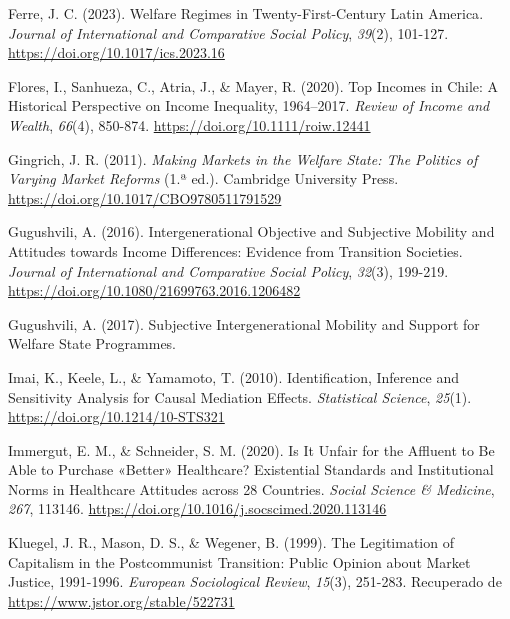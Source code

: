 \documentclass[
  spanish,
  letterpaper,
  DIV=11,
  numbers=noendperiod,
  oneside]{scrartcl}
\newlength{\cslhangindent}
\newenvironment{CSLReferences}[2] %
 {\begin{list}{}{%
  \setlength{\itemindent}{0pt}
  \setlength{\leftmargin}{0pt}
  \setlength{\parsep}{0pt}
  \ifodd #1
   \setlength{\leftmargin}{\cslhangindent}
   \setlength{\itemindent}{-1\cslhangindent}
  \fi
  \setlength{\itemsep}{#2\baselineskip}}}
 {\end{list}}
\begin{document}
\begin{CSLReferences}{1}{0}
Ferre, J. C. (2023). Welfare Regimes in Twenty-First-Century {Latin
America}. \emph{Journal of International and Comparative Social Policy},
\emph{39}(2), 101-127. \url{https://doi.org/10.1017/ics.2023.16}

Flores, I., Sanhueza, C., Atria, J., \& Mayer, R. (2020). Top {Incomes}
in {Chile}: {A Historical Perspective} on {Income Inequality},
1964--2017. \emph{Review of Income and Wealth}, \emph{66}(4), 850-874.
\url{https://doi.org/10.1111/roiw.12441}

Gingrich, J. R. (2011). \emph{Making {Markets} in the {Welfare State}:
{The Politics} of {Varying Market Reforms}} (1.ª ed.). Cambridge
University Press. \url{https://doi.org/10.1017/CBO9780511791529}

Gugushvili, A. (2016). Intergenerational Objective and Subjective
Mobility and Attitudes towards Income Differences: Evidence from
Transition Societies. \emph{Journal of International and Comparative
Social Policy}, \emph{32}(3), 199-219.
\url{https://doi.org/10.1080/21699763.2016.1206482}

Gugushvili, A. (2017). Subjective {Intergenerational Mobility} and
{Support} for {Welfare State Programmes}.

Imai, K., Keele, L., \& Yamamoto, T. (2010). Identification, {Inference}
and {Sensitivity Analysis} for {Causal Mediation Effects}.
\emph{Statistical Science}, \emph{25}(1).
\url{https://doi.org/10.1214/10-STS321}

Immergut, E. M., \& Schneider, S. M. (2020). Is It Unfair for the
Affluent to Be Able to Purchase {«Better»} Healthcare? {Existential}
Standards and Institutional Norms in Healthcare Attitudes across 28
Countries. \emph{Social Science \& Medicine}, \emph{267}, 113146.
\url{https://doi.org/10.1016/j.socscimed.2020.113146}

Kluegel, J. R., Mason, D. S., \& Wegener, B. (1999). The {Legitimation}
of {Capitalism} in the {Postcommunist Transition}: {Public Opinion}
about {Market Justice}, 1991-1996. \emph{European Sociological Review},
\emph{15}(3), 251-283. Recuperado de
\url{https://www.jstor.org/stable/522731}


\end{CSLReferences}
\end{document}
